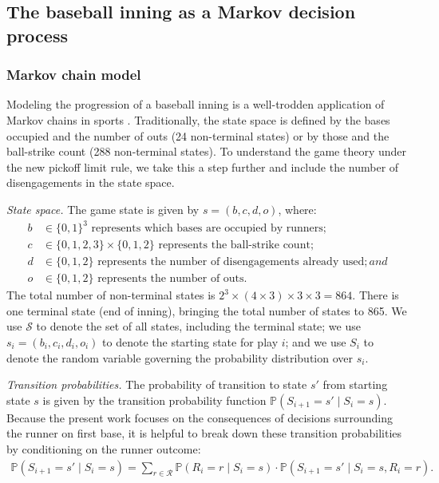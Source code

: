 \documentclass{article}
\begin{document}
    \subsection{The baseball inning as a Markov decision process}

      \subsubsection{Markov chain model}

        Modeling the progression of a baseball inning is a well-trodden application of Markov chains in sports \parencite{bukiet_markov_1997}. Traditionally, the state space is defined by the bases occupied and the number of outs (24 non-terminal states) or by those and the ball-strike count (288 non-terminal states). To understand the game theory under the new pickoff limit rule, we take this a step further and include the number of disengagements in the state space.
      
        {\it State space.} The game state is given by $s = (b, c, d, o)$, where:
        \begin{align*}
          b &\in \{0, 1\}^3 \mbox{ represents which bases are occupied by runners};\\
          c &\in \{0, 1, 2, 3\} \times \{0, 1, 2\} \mbox{ represents the ball-strike count};\\
          d &\in \{0, 1, 2\} \mbox{ represents the number of disengagements already used}; and\\
          o &\in \{0, 1, 2\} \mbox{ represents the number of outs}.
        \end{align*}
        The total number of non-terminal states is $2^3 \times (4 \times 3) \times 3 \times 3 = 864$. There is one terminal state (end of inning), bringing the total number of states to 865. We use $\mathcal{S}$ to denote the set of all states, including the terminal state; we use $s_i = (b_i, c_i, d_i, o_i)$ to denote the starting state for play $i$; and we use $S_i$ to denote the random variable governing the probability distribution over $s_i$.
  
        {\it Transition probabilities.} The probability of transition to state $s'$ from starting state $s$ is given by the transition probability function $\mathbb{P}(S_{i+1} = s' \mid S_i = s)$. Because the present work focuses on the consequences of decisions surrounding the runner on first base, it is helpful to break down these transition probabilities by conditioning on the runner outcome:
        \begin{align}
          \label{eqn:transition-prob}
          \mathbb{P}(S_{i+1} = s' \mid S_i = s) = \sum_{r \in \mathcal{R}} \mathbb{P}(R_i = r \mid S_i = s) \cdot \mathbb{P}(S_{i+1} = s' \mid S_i = s, R_i = r).
        \end{align}
\end{document}
